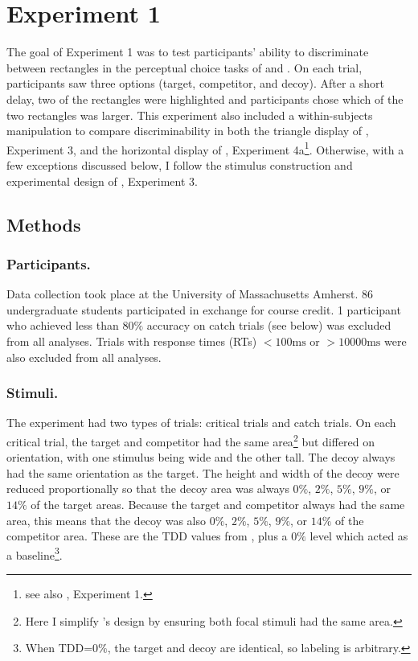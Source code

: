 \section{Experiment 1}

The goal of Experiment 1 was to test participants' ability to discriminate between rectangles in the perceptual choice tasks of \textcite{trueblood2013not} and \textcite{spektorWhenGoodLooks2018b}. 
On each trial, participants saw three options (target, competitor, and decoy). After a short delay, two of the rectangles were highlighted and participants chose which of the two rectangles was larger. 
This experiment also included a within-subjects manipulation to compare discriminability in both the triangle display of \textcite{spektorWhenGoodLooks2018b}, Experiment 3, and the horizontal display of \textcite{spektorWhenGoodLooks2018b}, Experiment 4a\footnote{see also \textcite{trueblood2013not}, Experiment 1.}. Otherwise, with a few exceptions discussed below, I follow the stimulus construction and experimental design of \textcite{spektorWhenGoodLooks2018b}, Experiment 3. 

\subsection{Methods}

\subsubsection{Participants.}
Data collection took place at the University of Massachusetts Amherst. 86 undergraduate students participated in exchange for course credit. 1 participant who achieved less than $80\%$ accuracy on catch trials (see below) was excluded from all analyses. Trials with response times (RTs) $<100\text{ms}$ or  $>10000\text{ms}$ were also excluded from all analyses.

\subsubsection{Stimuli.}
The experiment had two types of trials: critical trials and catch trials. 
On each critical trial, the target and competitor had the same area\footnote{Here I simplify \textcite{spektorWhenGoodLooks2018b}'s design by ensuring both focal stimuli had the same area.} but differed on orientation, with one stimulus being wide and the other tall. The decoy always had the same orientation as the target. The height and width of the decoy were reduced proportionally so that the decoy area was always $0\%$, $2\%$, $5\%$, $9\%$, or $14\%$ of the target areas. Because the target and competitor always had the same area, this means that the decoy was also $0\%$, $2\%$, $5\%$, $9\%$, or $14\%$ of the competitor area. These are the TDD values from \textcite{spektorWhenGoodLooks2018b}, plus a $0\%$ level which acted as a baseline\footnote{When TDD=$0\%$, the target and decoy are identical, so labeling is arbitrary.}.


